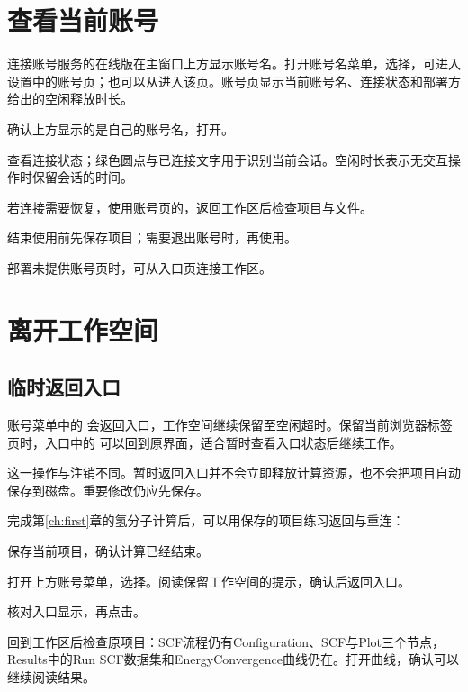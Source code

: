 \section{查看当前账号}

连接账号服务的在线版在主窗口上方显示账号名。打开账号名菜单，选择，可进入设置中的账号页；也可以从进入该页。账号页显示当前账号名、连接状态和部署方给出的空闲释放时长。

\begin{steps}
\item 确认上方显示的是自己的账号名，打开。
\item 查看连接状态；绿色圆点与已连接文字用于识别当前会话。空闲时长表示无交互操作时保留会话的时间。
\item 若连接需要恢复，使用账号页的，返回工作区后检查项目与文件。
\item 结束使用前先保存项目；需要退出账号时，再使用。
\end{steps}

部署未提供账号页时，可从入口页连接工作区。


\section{离开工作空间}

\subsection{临时返回入口}

账号菜单中的  会返回入口，工作空间继续保留至空闲超时。保留当前浏览器标签页时，入口中的  可以回到原界面，适合暂时查看入口状态后继续工作。

这一操作与注销不同。暂时返回入口并不会立即释放计算资源，也不会把项目自动保存到磁盘。重要修改仍应先保存。

完成第\ref{ch:first}章的氢分子计算后，可以用保存的项目练习返回与重连：
\begin{steps}
\item 保存当前项目，确认计算已经结束。
\item 打开上方账号菜单，选择。阅读保留工作空间的提示，确认后返回入口。
\item 核对入口显示，再点击。
\item 回到工作区后检查原项目：SCF流程仍有Configuration、SCF与Plot三个节点，Results中的Run SCF数据集和EnergyConvergence曲线仍在。打开曲线，确认可以继续阅读结果。
\end{steps}

